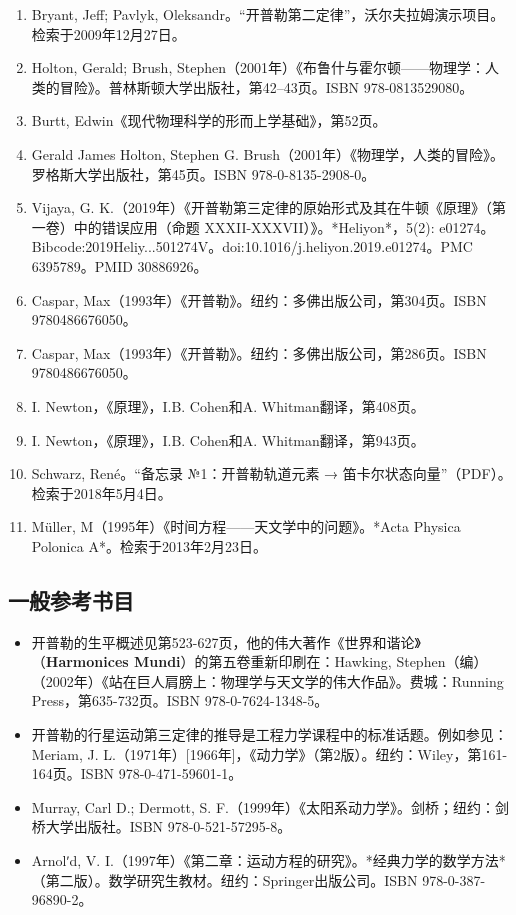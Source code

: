 \begin{enumerate}
\item Bryant, Jeff; Pavlyk, Oleksandr。“开普勒第二定律”，沃尔夫拉姆演示项目。检索于2009年12月27日。
\item Holton, Gerald; Brush, Stephen（2001年）《布鲁什与霍尔顿——物理学：人类的冒险》。普林斯顿大学出版社，第42–43页。ISBN 978-0813529080。
\item Burtt, Edwin《现代物理科学的形而上学基础》，第52页。
\item Gerald James Holton, Stephen G. Brush（2001年）《物理学，人类的冒险》。罗格斯大学出版社，第45页。ISBN 978-0-8135-2908-0。
\item Vijaya, G. K.（2019年）《开普勒第三定律的原始形式及其在牛顿《原理》（第一卷）中的错误应用（命题 XXXII-XXXVII）》。*Heliyon*，5(2): e01274。Bibcode:2019Heliy...501274V。doi:10.1016/j.heliyon.2019.e01274。PMC 6395789。PMID 30886926。
\item Caspar, Max（1993年）《开普勒》。纽约：多佛出版公司，第304页。ISBN 9780486676050。
\item Caspar, Max（1993年）《开普勒》。纽约：多佛出版公司，第286页。ISBN 9780486676050。
\item I. Newton，《原理》，I.B. Cohen和A. Whitman翻译，第408页。
\item I. Newton，《原理》，I.B. Cohen和A. Whitman翻译，第943页。
\item Schwarz, René。“备忘录 №1：开普勒轨道元素 → 笛卡尔状态向量”（PDF）。检索于2018年5月4日。
\item Müller, M（1995年）《时间方程——天文学中的问题》。*Acta Physica Polonica A*。检索于2013年2月23日。
\end{enumerate}
\subsection{一般参考书目}
\begin{itemize}
\item 开普勒的生平概述见第523-627页，他的伟大著作《世界和谐论》（\textbf{Harmonices Mundi}）的第五卷重新印刷在：Hawking, Stephen（编）（2002年）《站在巨人肩膀上：物理学与天文学的伟大作品》。费城：Running Press，第635-732页。ISBN 978-0-7624-1348-5。
\item 开普勒的行星运动第三定律的推导是工程力学课程中的标准话题。例如参见：Meriam, J. L.（1971年）[1966年]，《动力学》（第2版）。纽约：Wiley，第161-164页。ISBN 978-0-471-59601-1。
\item Murray, Carl D.; Dermott, S. F.（1999年）《太阳系动力学》。剑桥；纽约：剑桥大学出版社。ISBN 978-0-521-57295-8。
\item Arnolʹd, V. I.（1997年）《第二章：运动方程的研究》。*经典力学的数学方法*（第二版）。数学研究生教材。纽约：Springer出版公司。ISBN 978-0-387-96890-2。
\end{itemize}
